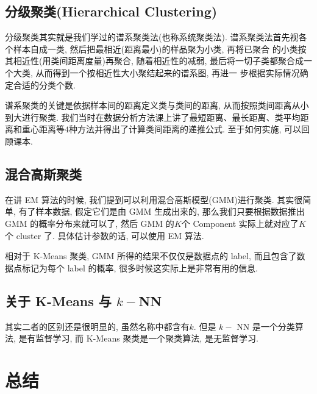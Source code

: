 \documentclass[a4paper,UTF8]{ctexart}
\theoremstyle{plain} \newtheorem{theorem}{定理}[section]
\theoremstyle{plain} \newtheorem{definition}{定义}[section]
\theoremstyle{plain} \newtheorem{lemma}{引理}[section]
\theoremstyle{plain} \newtheorem{proposition}{命题}[section]
\theoremstyle{plain} \newtheorem{example}{例}[section]
\theoremstyle{plain} \newtheorem{remark}{注}[section]
\theoremstyle{plain} \newtheorem{corollary}{推论}[section]
\begin{document}
\subsection{分级聚类(Hierarchical Clustering)}
分级聚类其实就是我们学过的谱系聚类法(也称系统聚类法). 谱系聚类法首先视各个样本自成一类, 然后把最相近(距离最小)的样品聚为小类, 再将已聚合
的小类按其相近性(用类间距离度量)再聚合, 随着相近性的减弱, 最后将一切子类都聚合成一个大类, 从而得到一个按相近性大小聚结起来的谱系图, 再进一
步根据实际情况确定合适的分类个数. 

谱系聚类的关键是依据样本间的距离定义类与类间的距离, 从而按照类间距离从小到大进行聚类. 我们当时在数据分析方法课上讲了最短距离、最长距离、类平均距离和重心距离等$4$种方法并得出了计算类间距离的递推公式. 至于如何实施, 可以回顾课本.


\subsection{混合高斯聚类}
在讲 EM 算法的时候, 我们提到可以利用混合高斯模型(GMM)进行聚类. 其实很简单, 有了样本数据, 假定它们是由 GMM 生成出来的, 那么我们只要根据数据推出 GMM 的概率分布来就可以了, 然后 GMM 的$K$个 Component 实际上就对应了$K$个 cluster 了. 具体估计参数的话, 可以使用 EM 算法.

相对于 K-Means 聚类, GMM 所得的结果不仅仅是数据点的 label, 而且包含了数据点标记为每个 label 的概率, 很多时候这实际上是非常有用的信息.


\subsection{关于 K-Means 与 $k-$NN}
其实二者的区别还是很明显的, 虽然名称中都含有$k$. 但是 $k-$ NN 是一个分类算法, 是有监督学习, 而 K-Means 聚类是一个聚类算法, 是无监督学习.








\section{总结}
\end{document}
